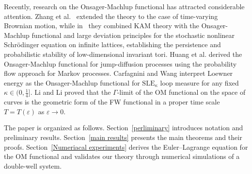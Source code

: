 \documentclass[preprint,12pt]{elsarticle}
\theoremstyle{definition}  %
\theoremstyle{plain}  %
\begin{document}
Recently, research on the Onsager-Machlup functional has attracted considerable attention. Zhang et al.~\cite{zhang2024onsagermachlupfunctionalstochasticdifferential} extended the theory to the case of time-varying Brownian motion, while in~\cite{zhang2025persistenceinvarianttoristochastic} they combined KAM theory with the Onsager-Machlup functional and large deviation principles for the stochastic nonlinear Schrödinger equation on infinite lattices, establishing the persistence and probabilistic stability of low-dimensional invariant tori. Huang et al. \cite{duanjq} derived the Onsager-Machlup functional for jump-diffusion processes using the probability flow approach for Markov processes. Carfagnini and Wang \cite{Carfagnini2024} interpret Loewner energy as the Onsager-Machlup functional for {$\text{SLE}_{\kappa}$} loop measure for any fixed $\kappa\in (0,\frac{1}{4}]$. Li and Li \cite{doi:10.1137/20M1310539} proved that the $\Gamma$-limit of the OM functional on the space of curves is the geometric form of the FW functional in a proper time scale $T=T(\varepsilon)$ as $\varepsilon \to 0$.


The paper is organized as follows. Section~\ref{perliminary} introduces notation and preliminary results. Section~\ref{main results} presents the main theorems and their proofs. Section~\ref{Numeriacal experiments} derives the Euler–Lagrange equation for the OM functional and validates our theory through numerical simulations of a double-well system.






    
\end{document}
